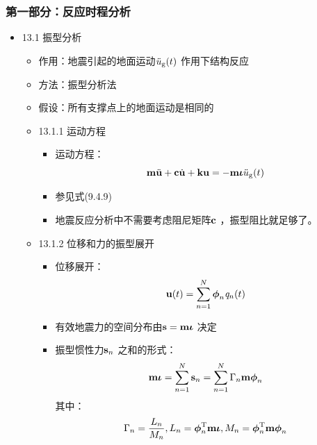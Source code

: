 \documentclass[11pt]{article}
\begin{document}
\subsubsection*{第一部分：反应时程分析}
\label{sec:orgd5253ea}
\begin{itemize}
\item 13.1 振型分析
\label{sec:org3d0853e}
\begin{itemize}
\item 作用：地震引起的地面运动\(\ddugt\) 作用下结构反应
\item 方法：振型分析法
\item 假设：所有支撑点上的地面运动是相同的
\end{itemize}
\begin{itemize}
\item 13.1.1 运动方程
\label{sec:orgc9144a9}
\begin{itemize}
\item 运动方程：$$ \vm \vddu + \vc \vdu + \vk \vu = - \vm \viota  \ddugt $$
\item {} 参见式(9.4.9)
\item 地震反应分析中不需要考虑阻尼矩阵\(\vc\) ，振型阻比就足够了。
\end{itemize}
\item 13.1.2 位移和力的振型展开
\label{sec:org69a62ff}
\begin{itemize}
\item 位移展开：$$\vut = \sumn \vphin \qnt$$
\item 有效地震力的空间分布由\(\vs = \vm \viota\) 决定

\item 振型惯性力\(\vsn\) 之和的形式：
$$\vm\viota=\sumn \vsn = \sumn \Gamman \vm \vphin$$
其中：$$\Gamman = \dfrac{L_{n}}{M_{n}}, L_{n}=\vphint \vm \viota, M_{n}=\vphint \vm \vphin $$


\end{itemize}
\end{itemize}
\end{itemize}
\end{document}
